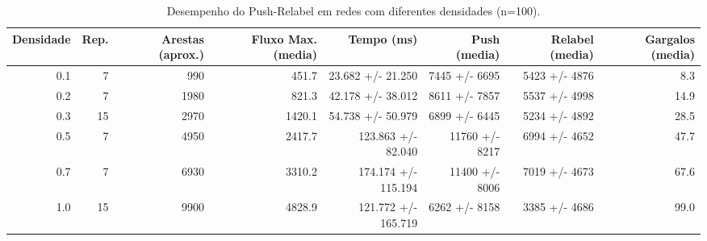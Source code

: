 \begin{table}
\caption{Desempenho do Push-Relabel em redes com diferentes densidades (n=100).}
\label{tab:densidade}
\begin{tabular}{r r r r r r r r}
\toprule
Densidade & Rep. & Arestas (aprox.) & Fluxo Max. (media) & Tempo (ms) & Push (media) & Relabel (media) & Gargalos (media) \\
\midrule
0.1 & 7 & 990 & 451.7 & 23.682 +/- 21.250 & 7445 +/- 6695 & 5423 +/- 4876 & 8.3 \\
0.2 & 7 & 1980 & 821.3 & 42.178 +/- 38.012 & 8611 +/- 7857 & 5537 +/- 4998 & 14.9 \\
0.3 & 15 & 2970 & 1420.1 & 54.738 +/- 50.979 & 6899 +/- 6445 & 5234 +/- 4892 & 28.5 \\
0.5 & 7 & 4950 & 2417.7 & 123.863 +/- 82.040 & 11760 +/- 8217 & 6994 +/- 4652 & 47.7 \\
0.7 & 7 & 6930 & 3310.2 & 174.174 +/- 115.194 & 11400 +/- 8006 & 7019 +/- 4673 & 67.6 \\
1.0 & 15 & 9900 & 4828.9 & 121.772 +/- 165.719 & 6262 +/- 8158 & 3385 +/- 4686 & 99.0 \\
\bottomrule
\end{tabular}
\end{table}
